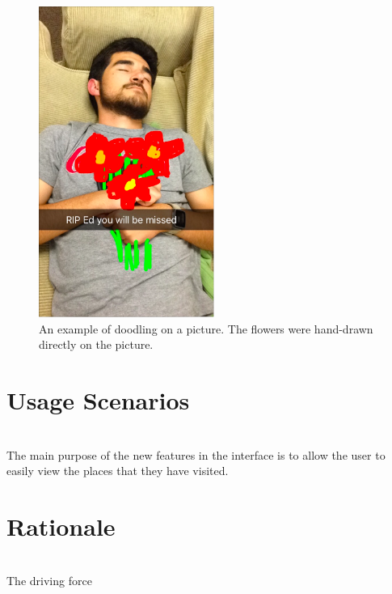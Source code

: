 \documentclass[11pt]{article}
\begin{document}
\begin{figure}[ht]
\centering
\includegraphics[height=4in]{images/rip_ed.png}
\caption{An example of doodling on a picture. The flowers were hand-drawn directly on the picture.}
\label{ed}
\end{figure}

\section{Usage Scenarios}
\label{Usage Scenarios}
   \indent \\
   \indent The main purpose of the new features in the interface is to allow the user to easily view the places that they have visited. \\


\section{Rationale}
   \indent \\
   \indent The driving force
\end{document}

